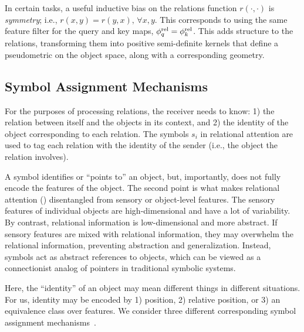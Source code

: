 In certain tasks, a useful inductive bias on the relations function $r(\cdot, \cdot)$ is \textit{symmetry}; i.e., $r(x, y) = r(y, x),\, \forall x, y$. This corresponds to using the same feature filter for the query and key maps, $\phi_q^{\mathrm{rel}} = \phi_k^{\mathrm{rel}}$. This adds structure to the relations, transforming them into positive semi-definite kernels that define a pseudometric on the object space, along with a corresponding geometry. %

\subsection{Symbol Assignment Mechanisms}

For the purposes of processing relations, the receiver needs to know: 1) the relation between itself and the objects in its context, and 2) the identity of the object corresponding to each relation.
The symbols $s_i$ in relational attention are used to tag each relation with the identity of the sender  (i.e., the object the relation involves). 


A symbol identifies or ``points to'' an object, but, importantly, does not fully encode the features of the object. The second point is what makes relational attention () disentangled from sensory or object-level features. The sensory features of individual objects are high-dimensional and have a lot of variability. By contrast, relational information is low-dimensional and more abstract. If sensory features are mixed with relational information, they may overwhelm the relational information, preventing abstraction and generalization. Instead, symbols act as abstract references to objects, which can be viewed as a connectionist analog of pointers in traditional symbolic systems.

Here, the ``identity'' of an object may mean different things in different situations. For us, identity may be encoded by 1) position, 2) relative position, or 3) an equivalence class over features. We consider three different corresponding symbol assignment mechanisms~\citep{altabaa2024abstractors}.


